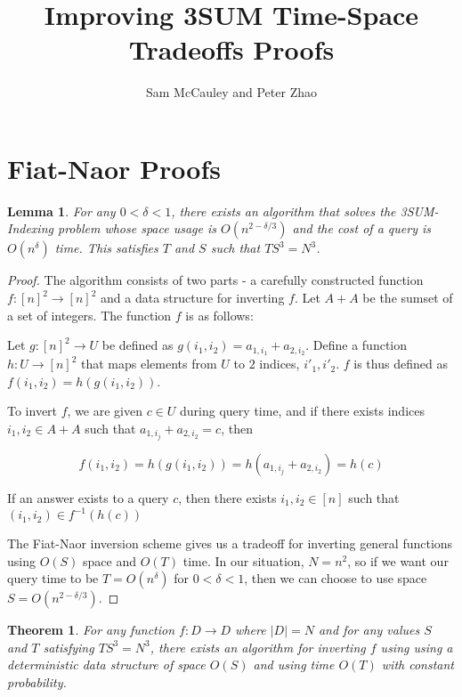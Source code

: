 \documentclass{article}
\title{Improving 3SUM Time-Space Tradeoffs Proofs}
\author{Sam McCauley and Peter Zhao}
\date{}
\newtheorem{theorem}{Theorem}
\newtheorem{lemma}{Lemma}
\begin{document}
\maketitle

\section{Fiat-Naor Proofs}
\label{sec:fiat-naor}

\begin{lemma}
\label{3SUM-Indexing}
For any $0 < \delta < 1$, there exists an algorithm that solves the 3SUM-Indexing problem whose space usage is $O(n^{2 - \delta/3})$ and the cost of a query is $O(n^{\delta})$ time. This satisfies $T$ and $S$ such that $TS^3 = N^3$.
\end{lemma}

\begin{proof}
The algorithm consists of two parts - a carefully constructed function $f:[n]^2 \rightarrow [n]^2$ and a data structure for inverting $f$. Let $A+A$ be the sumset of a set of integers. The function $f$ is as follows:

Let $g: [n]^2 \rightarrow U$ be defined as $g(i_1, i_2) = a_{1,i_1} + a_{2,i_2}$. Define a function $h: U \rightarrow [n]^2$ that maps elements from $U$ to $2$ indices, $i'_1,i'_2$. $f$ is thus defined as $f(i_1,i_2) = h(g(i_1,i_2))$.

To invert $f$, we are given $c \in U$ during query time, and if there exists indices $i_1,i_2 \in A+A$ such that $a_{1,i_j} + a_{2,i_2} = c$, then

$$f(i_1,i_2) = h(g(i_1,i_2)) = h(a_{1,i_j} + a_{2,i_2})= h(c)$$

If an answer exists to a query $c$, then there exists $i_1,i_2 \in [n]$ such that $(i_1,i_2) \in f^{-1}(h(c))$

The Fiat-Naor inversion scheme gives us a tradeoff for inverting general functions using $O(S)$ space and $O(T)$ time. In our situation, $N=n^2$, so if we want our query time to be $T=O(n^\delta)$ for $0 < \delta < 1$, then we can choose to use space $S = O(n^{2-\delta/3})$.
\end{proof}

\begin{theorem}
\label{Fiat-Naor}
For any function $f:D \rightarrow D$ where $|D| = N$ and for any values $S$ and $T$ satisfying $TS^3 = N^3$, there exists an algorithm for inverting $f$ using using a deterministic data structure of space $O(S)$ and using time $O(T)$ with constant probability.
\end{theorem}
\end{document}
